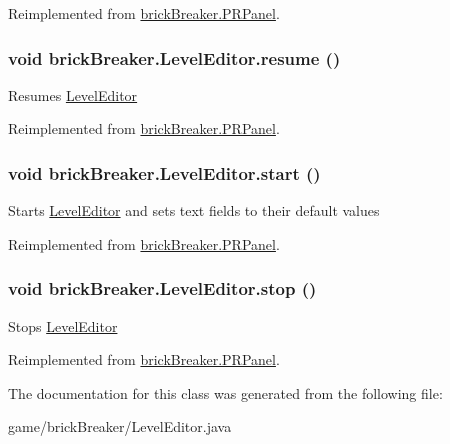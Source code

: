 Reimplemented from \hyperlink{classbrick_breaker_1_1_p_r_panel}{brickBreaker.PRPanel}.

\hypertarget{classbrick_breaker_1_1_level_editor_a25e9ea0a6e91f1848c3b76f66a238789}{
\subsubsection[{resume}]{\setlength{\rightskip}{0pt plus 5cm}void brickBreaker.LevelEditor.resume ()}}
\label{classbrick_breaker_1_1_level_editor_a25e9ea0a6e91f1848c3b76f66a238789}
Resumes \hyperlink{classbrick_breaker_1_1_level_editor}{LevelEditor} 

Reimplemented from \hyperlink{classbrick_breaker_1_1_p_r_panel}{brickBreaker.PRPanel}.

\hypertarget{classbrick_breaker_1_1_level_editor_ab2df7eb7b75f4e87b25c4b2d9422dc3d}{
\subsubsection[{start}]{\setlength{\rightskip}{0pt plus 5cm}void brickBreaker.LevelEditor.start ()}}
\label{classbrick_breaker_1_1_level_editor_ab2df7eb7b75f4e87b25c4b2d9422dc3d}
Starts \hyperlink{classbrick_breaker_1_1_level_editor}{LevelEditor} and sets text fields to their default values 

Reimplemented from \hyperlink{classbrick_breaker_1_1_p_r_panel}{brickBreaker.PRPanel}.

\hypertarget{classbrick_breaker_1_1_level_editor_aa38941ac69b2b38f472fd402d3e33e40}{
\subsubsection[{stop}]{\setlength{\rightskip}{0pt plus 5cm}void brickBreaker.LevelEditor.stop ()}}
\label{classbrick_breaker_1_1_level_editor_aa38941ac69b2b38f472fd402d3e33e40}
Stops \hyperlink{classbrick_breaker_1_1_level_editor}{LevelEditor} 

Reimplemented from \hyperlink{classbrick_breaker_1_1_p_r_panel}{brickBreaker.PRPanel}.



The documentation for this class was generated from the following file:\begin{DoxyCompactItemize}
\item 
game/brickBreaker/LevelEditor.java\end{DoxyCompactItemize}
